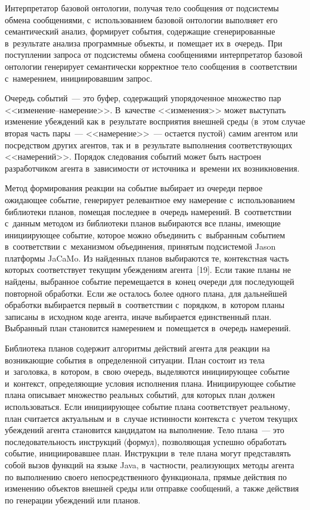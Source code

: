 \begin{multicols}{2}
  Интерпретатор базовой онтологии, получая тело сообщения от подсистемы 
обмена сообщениями, с~использованием базовой онтологии выполняет его 
семантический анализ, формирует события, содержащие сгенерированные 
в~результате анализа программные объекты, и~помещает их в~очередь. При 
по\-ступ\-ле\-нии запроса от под\-сис\-те\-мы обмена сообщениями интерпретатор 
базовой онтологии генерирует семантически корректное тело сообщения в~соответствии с~намерением, ини\-ци\-иро\-вав\-шим запрос. 
  
  Очередь событий~--- это буфер, содержащий упорядоченное множество пар  
<<из\-ме\-не\-ние--на\-ме\-ре\-ние>>. В~качестве <<изменения>> может 
выступать изменение убеж\-де\-ний как в~результате восприятия внешней среды 
(в~этом случае вторая часть пары~--- <<намерение>>~--- остается пустой) 
самим агентом или посредством других агентов, так и~в~результате выполнения 
со\-от\-вет\-ст\-ву\-ющих <<намерений>>. Порядок следования событий может быть 
настроен разработчиком агента в~за\-ви\-си\-мости от источника и~времени их 
возникновения.
  
  Метод формирования реакции на событие выбирает из очереди первое 
ожи\-да\-ющее событие, генерирует ре\-ле\-вант\-ное ему намерение с~использованием 
биб\-лио\-те\-ки планов, помещая последнее в~\mbox{оче\-редь} намерений. В~соответствии 
с~данным методом из биб\-лио\-те\-ки планов выбираются все планы, име\-ющие 
ини\-ци\-иру\-ющее событие, которое мож\-но объединить с~выбранным событием 
в~соответствии с~механизмом объединения, принятым под\-сис\-те\-мой Jason 
платформы JaCaMo. Из найден\-ных планов выбираются те, контекстная часть 
которых соответствует текущим убеж\-де\-ни\-ям агента~[19]. Если такие планы не 
найдены, выбранное событие перемещается в~конец очереди для последующей 
повторной обработки. Если же осталось более одного плана, для дальнейшей 
обработки выбирается первый в~соответствии с~порядком, в~котором планы 
записаны в~исходном коде агента, иначе выбирается единственный план. 
Выбранный план становится намерением и~помещается в~очередь намерений. 
  
  Библиотека планов содержит алгоритмы действий агента для реакции на 
возникающие события в~определенной ситуации. План со\-сто\-ит из тела 
и~заголовка, в~котором, в~свою очередь, выделяются ини\-ци\-иру\-ющее событие 
и~контекст, оп\-ре\-де\-ля\-ющие условия исполнения плана. Ини\-ци\-иру\-ющее 
событие плана описывает множество реальных событий, для которых план 
должен использоваться. Если ини\-ци\-иру\-ющее событие плана соответствует 
реальному, план считается актуальным и~в~случае ис\-тин\-ности кон\-текс\-та 
с~учетом текущих убеж\-де\-ний агента становится кандидатом на выполнение. 
Тело плана~--- это по\-сле\-до\-ва\-тель\-ность инструкций (формул), позволяющая 
успешно обработать событие, ини\-ци\-иро\-вав\-шее план. Инструкции в~теле плана 
могут представлять собой вызов функций на языке Java, в~част\-ности, 
ре\-а\-ли\-зу\-ющих методы агента по выполнению своего непосредственного 
функционала, прямые действия по изменению объектов внеш\-ней среды или 
отправке сообщений, а~так\-же действия по генерации убеж\-де\-ний или планов. 
  

\end{multicols}
